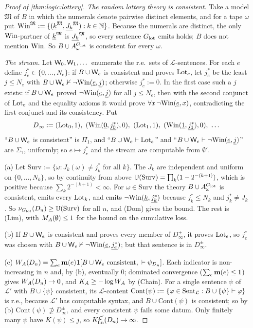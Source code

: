 \begin{proof}[Proof of \cref{thm:logic:lottery}]
\emph{The random lottery theory is consistent.} Take a model $\mathfrak M$ of $B$ in which the numerals denote pairwise distinct elements, and for a tape $\omega$ put $\mathrm{Win}^{\mathfrak M}:=\{(\underline{k}^{\mathfrak M},\underline{J_k}^{\mathfrak M}):k\in\mathbb N\}$. Because the numerals are distinct, the only $\mathrm{Win}$-partner of $\underline{k}^{\mathfrak M}$ is $\underline{J_k}^{\mathfrak M}$, so every sentence $G_{\mathrm{lot}}$ emits holds; $B$ does not mention $\mathrm{Win}$. So $B\cup A^{G_{\mathrm{lot}}}_\omega$ is consistent for every $\omega$.

\emph{The stream.} Let $\mathsf{W}_{0},\mathsf{W}_{1},\dots$ enumerate the r.e.\ sets of $\mathcal L$-sentences. For each $e$ define $j^*_e\in\{0,\dots,N_e\}$: if $B\cup\mathsf{W}_{e}$ is consistent and proves $\mathrm{Lot}_e$, let $j^*_e$ be the least $j\le N_e$ with $B\cup\mathsf{W}_{e}\nvdash\neg\mathrm{Win}(\underline{e},\underline{j})$; otherwise $j^*_e:=0$. In the first case such a $j$ exists: if $B\cup\mathsf{W}_{e}$ proved $\neg\mathrm{Win}(\underline{e},\underline{j})$ for all $j\le N_e$, then with the second conjunct of $\mathrm{Lot}_e$ and the equality axioms it would prove $\forall x\,\neg\mathrm{Win}(\underline{e},x)$, contradicting the first conjunct and its consistency. Put
\[
D_\infty:=(\Lot_0,1),\ (\Win(\num0,\num{j^*_0}),0),\ (\Lot_1,1),\ (\Win(\num1,\num{j^*_1}),0),\ \dots
\]
``$B\cup\mathsf{W}_{e}$ is consistent'' is $\Pi_1$, and ``$B\cup\mathsf{W}_{e}\vdash\mathrm{Lot}_e$'' and ``$B\cup\mathsf{W}_{e}\vdash\neg\mathrm{Win}(\underline{e},\underline{j})$'' are $\Sigma_1$, uniformly; so $e\mapsto j^*_e$ and the stream are computable from $\emptyset'$.

(a) Let $\mathrm{Surv}:=\{\omega:J_k(\omega)\ne j^*_k\text{ for all }k\}$. The $J_k$ are independent and uniform on $\{0,\dots,N_k\}$, so by continuity from above $\mathbb{U}(\mathrm{Surv})=\prod_k(1-2^{-(k+1)})$, which is positive because $\sum_k2^{-(k+1)}<\infty$. For $\omega\in\mathrm{Surv}$ the theory $B\cup A^{G_{\mathrm{lot}}}_\omega$ is consistent, emits every $\mathrm{Lot}_k$, and emits $\neg\mathrm{Win}(\underline{k},\underline{j^*_k})$ because $j^*_k\le N_k$ and $j^*_k\ne J_k$. So $\nu_{G_{\mathrm{lot}}}(D_n)\ge\mathbb{U}(\mathrm{Surv})$ for all $n$, and (Dom) gives the bound. The rest is (Lim), with $M_{A}(\emptyset)\le1$ for the bound on the cumulative loss.

(b) If $B\cup\mathsf{W}_{e}$ is consistent and proves every member of $D_\infty^\pm$, it proves $\mathrm{Lot}_e$, so $j^*_e$ was chosen with $B\cup\mathsf{W}_{e}\nvdash\neg\mathrm{Win}(\underline{e},\underline{j^*_e})$; but that sentence is in $D_\infty^\pm$.

(c) $W_{A}(D_n)=\sum_e\mathbf{m}(e)\mathbf{1}[B\cup\mathsf{W}_{e}\text{ consistent},\ \vdash\psi_{D_n}]$. Each indicator is non-increasing in $n$ and, by (b), eventually $0$; dominated convergence ($\sum_e\mathbf{m}(e)\le1$) gives $W_{A}(D_n)\to0$, and $K_{A}\ge-\log W_{A}$ by (Chain). For a single sentence $\psi$ of $\mathcal L'$ with $B\cup\{\psi\}$ consistent, its $\mathcal L$-content $\mathrm{Cont}(\psi):=\{\varphi\in\mathrm{Sent}_{\mathcal L}:B\cup\{\psi\}\vdash\varphi\}$ is r.e., because $\mathcal L'$ has computable syntax, and $B\cup\mathrm{Cont}(\psi)$ is consistent; so by (b) $\mathrm{Cont}(\psi)\not\supseteq D_\infty^\pm$, and every consistent $\psi$ fails some datum. Only finitely many $\psi$ have $K(\psi)\le j$, so $K_{\mathrm{fin}}^{\mathcal L'}(D_n)\to\infty$.


\end{proof}
